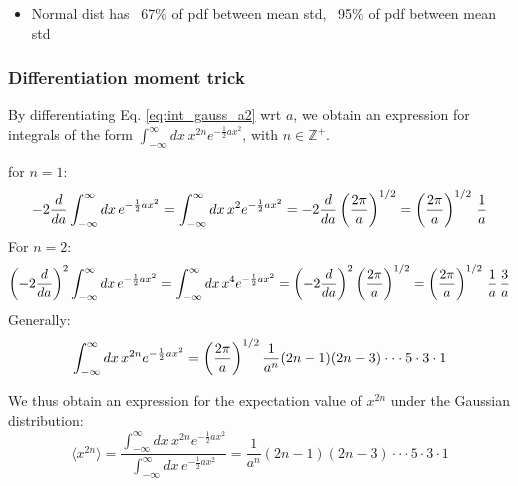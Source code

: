 \documentclass[11pt]{article}
\begin{document}
\begin{itemize}
  \item Normal dist has ~67\% of pdf between mean  std, ~95\% of pdf between mean
   std
\end{itemize}


\subsubsection{Differentiation moment trick}
\label{subsubsec:dmt}
By differentiating Eq. \ref{eq:int_gauss_a2} wrt $a$, we obtain an expression for
integrals of the form $\int_{-\infty}^{\infty}dx \, x^{2n} e^{-\frac{1}{2} a x^2}$, with
$n \in \mathbb{Z^+}$.

\eeg for $n=1$:
\begin{equation}
  - 2 \frac{d}{da} \int_{-\infty}^{\infty}dx \, e^{-\frac{1}{2} a x^2} =
  \int_{-\infty}^{\infty}dx \, x^2 e^{-\frac{1}{2} a x^2} =
  - 2 \frac{d}{da} \left( \frac{2\pi}{a} \right)^{1/2} =
  \left( \frac{2\pi}{a} \right)^{1/2} \, \frac{1}{a} 
\end{equation}
For $n=2$:
\begin{equation}
  \left( -2 \frac{d}{da} \right)^2 \int_{-\infty}^{\infty}dx \, e^{-\frac{1}{2} a x^2} =
  \int_{-\infty}^{\infty}dx \, x^4 e^{-\frac{1}{2} a x^2} =
  \left( -2 \frac{d}{da} \right)^2 \left( \frac{2\pi}{a} \right)^{1/2} =
  \left( \frac{2\pi}{a} \right)^{1/2} \, \frac{1}{a} \, \frac{3}{a}
\end{equation}
Generally:
\begin{equation}
  \int_{-\infty}^{\infty}dx \, x^{2n} e^{-\frac{1}{2} a x^2} =
  \left( \frac{2\pi}{a} \right)^{1/2} \frac{1}{a^n} (2n-1) (2n-3) \cdot\cdot\cdot 5 \cdot 3
  \cdot 1 
\end{equation}

We thus obtain an expression for the expectation value of $x^{2n}$ under the Gaussian
distribution: 
\begin{equation}
  \label{eq:x2n_moments}
  \langle x^{2n} \rangle =
  \frac{\int_{-\infty}^{\infty}dx \, x^{2n} e^{-\frac{1}{2} a x^2}}
       {\int_{-\infty}^{\infty}dx \, e^{-\frac{1}{2} a x^2}} =
  \frac{1}{a^n} (2n-1) (2n-3) \cdot\cdot\cdot 5 \cdot 3 \cdot 1
\end{equation}
\end{document}
